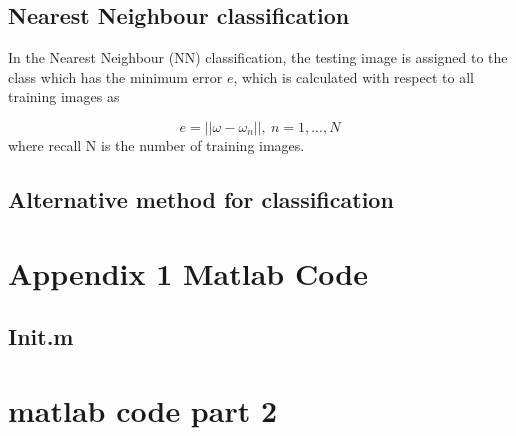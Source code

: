 \documentclass[10pt,twocolumn,letterpaper]{article}
\begin{document}
\subsection{Nearest Neighbour classification}
In the Nearest Neighbour (NN) classification, the testing image is assigned to the class which has the minimum error $e$, which is calculated with respect to all training images as

\begin{equation}
	e = || \omega - \omega_n||, ~ n = 1, ..., N
\end{equation}
where recall N is the number of training images. 







\subsection{Alternative method for classification}


{\small


}

\onecolumn
\appendix
\section{Appendix 1 Matlab Code}
\subsection{Init.m}


\section{matlab code part 2}

\end{document}
